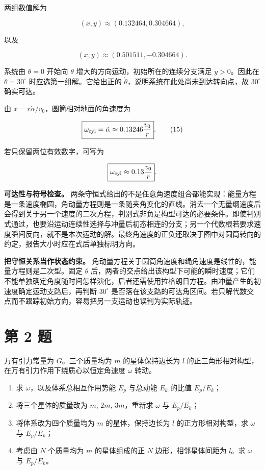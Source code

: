 \documentclass[12pt,a4paper,UTF8]{ctexart}
\newcommand{\tightlist}{\setlength{\itemsep}{0pt}\setlength{\parskip}{0pt}}
\begin{document}
两组数值解为

\[
(x,y)\approx(0.132464,0.304664),
\]

以及

\[
(x,y)\approx(0.501511,-0.304664).
\]

系统由 \(\theta=0\) 开始向 \(\theta\)
增大的方向运动，初始所在的连续分支满足 \(y>0\)。因此在
\(\theta=30^\circ\) 时应选第一组解。它给出正的
\(\dot\theta\)，说明系统在此处尚未到达转向点，故 \(30^\circ\) 确实可达。

由 \(x=r\dot\alpha/v_0\)，圆筒相对地面的角速度为

\[
\boxed{
\omega_{\rm cyl}=\dot\alpha
\approx0.13246\frac{v_0}{r}
}.
\tag{15}
\]

若只保留两位有效数字，可写为

\[
\boxed{\omega_{\rm cyl}\approx0.13\frac{v_0}{r}}.
\]

\textbf{可达性与符号检查。}
两条守恒式给出的不是任意角速度组合都能实现：能量方程是一条速度椭圆，角动量方程则是一条随夹角变化的直线。消去一个无量纲速度后会得到关于另一个速度的二次方程，判别式非负是构型可达的必要条件。即使判别式通过，也要沿运动连续性选择与冲量后初态相连的分支；另一个代数根若要求速度瞬间反向，就不是本次运动的解。最终角速度的正负还取决于图中对圆筒转向的约定，报告大小时应在式后单独标明方向。

\textbf{把守恒关系当作状态约束。}
角动量方程关于圆筒角速度和绳角速度是线性的，能量方程则是二次型。固定
\(\theta\)
后，两者的交点给出该构型下可能的瞬时速度；它们不能单独确定角度随时间怎样演化，后者还需使用拉格朗日方程。由冲量产生的初速度确定运动支路后，再判断
\(30^\circ\)
是否落在该支路的可达角区间。若只解代数交点而不跟踪初始方向，容易把另一支运动也误判为实际轨迹。

\newpage

\section{第 2 题}\label{ux7b2c-2-ux9898}

万有引力常量为 \(G\)。三个质量均为 \(m\) 的星体保持边长为 \(l\)
的正三角形相对构型，在万有引力作用下绕质心以恒定角速度 \(\omega\) 转动。

\begin{enumerate}
\def\labelenumi{\arabic{enumi}.}
\tightlist
\item
  求 \(\omega\)，以及体系总相互作用势能 \(E_p\) 与总动能 \(E_k\) 的比值
  \(E_p/E_k\)；
\item
  将三个星体的质量改为 \(m,\,2m,\,3m\)，重新求 \(\omega\) 与
  \(E_p/E_k\)；
\item
  将体系改为四个质量均为 \(m\) 的星体，保持边长为 \(l\)
  的正方形相对构型，求 \(\omega\) 与 \(E_p/E_k\)；
\item
  考虑由 \(N\) 个质量均为 \(m\) 的星体组成的正 \(N\)
  边形，相邻星体间距为 \(l\)。求 \(\omega\) 与 \(E_p/E_k\)。
\end{enumerate}
\end{document}
